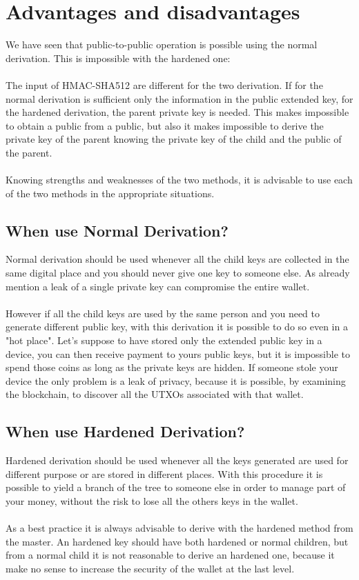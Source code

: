 \section{Advantages and disadvantages}
We have seen that public-to-public operation is possible using the normal derivation. This is impossible with the hardened one: \\ \\
The input of HMAC-SHA512 are different for the two derivation. If for the normal derivation is sufficient only the information in the public extended key, for the hardened derivation, the parent private key is needed. This makes impossible to obtain a public from a public, but also it makes impossible to derive the private key of the parent knowing the private key of the child and the public of the parent.
\\ \\
Knowing strengths and weaknesses of the two methods, it is advisable to use each of the two methods in the appropriate situations.

\subsection{When use Normal Derivation?}
Normal derivation should be used whenever all the child keys are collected in the same digital place and you should never give one key to someone else. As already mention a leak of a single private key can compromise the entire wallet.
\\ \\
However if all the child keys are used by the same person and you need to generate different public key, with this derivation it is possible to do so even in a "hot place". Let's suppose to have stored only the extended public key in a device, you can then receive payment to yours public keys, but it is impossible to spend those coins as long as the private keys are hidden. If someone stole your device the only problem is a leak of privacy, because it is possible, by examining the blockchain, to discover all the UTXOs associated with that wallet.


\subsection{When use Hardened Derivation?}
Hardened derivation should be used whenever all the keys generated are used for different purpose or are stored in different places. With this procedure it is possible to yield a branch of the tree to someone else in order to manage part of your money, without the risk to lose all the others keys in the wallet.
\\ \\
As a best practice it is always advisable to derive with the hardened method from the master. An hardened key should have both hardened or normal children, but from a normal child it is not reasonable to derive an hardened one, because it make no sense to increase the security of the wallet at the last level.


